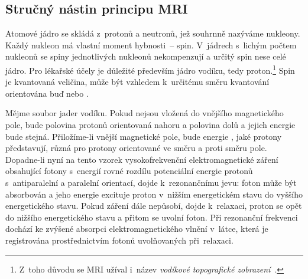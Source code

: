 \subsection{Stručný nástin principu MRI}\label{mribrief}%

Atomové jádro se skládá z~protonů a neutronů, jež souhrnně nazýváme nukleony.
Každý nukleon má vlastní moment hybnosti~-- spin. V~jádrech s~lichým počtem
nukleonů se spiny jednotlivých nukleonů nekompenzují a určitý spin nese celé
jádro. Pro lékařské účely je důležité především jádro vodíku, tedy
proton.\footnote{Z~toho důvodu se MRI užíval i~název \emph{vodíkové
    topografické zobrazení}~\cite{Ulm:LIVE:AplIonZarJRM:}.} Spin je kvantovaná
veličina, může být vzhledem k~určitému směru kvantování orientována buď
 nebo .

Mějme soubor jader vodíku. Pokud nejsou vložená do vnějšího magnetického pole,
bude polovina protonů orientovaná nahoru a polovina dolů a jejich energie bude
stejná. Přiložíme-li vnější magnetické pole, bude energie , jaké protony představují, různá pro protony orientované ve směru a
proti směru pole. Dopadne-li nyní na tento vzorek vysokofrekvenční
elektromagnetické záření obsahující fotony
s~energií rovné rozdílu potenciální energie protonů s~antiparalelní a
paralelní orientací, dojde k~rezonančnímu jevu: foton může být absorbován a
jeho energie excituje proton v~nižším energetickém stavu do vyššího
energetického stavu. Pokud záření dále nepůsobí, dojde k~relaxaci, proton se
opět  do nižšího energetického stavu a přitom se uvolní foton. Při
rezonanční frekvenci dochází ke zvýšené absorpci elektromagnetického vlnění
v~látce, která je registrována prostřednictvím fotonů uvolňovaných
při~relaxaci.

